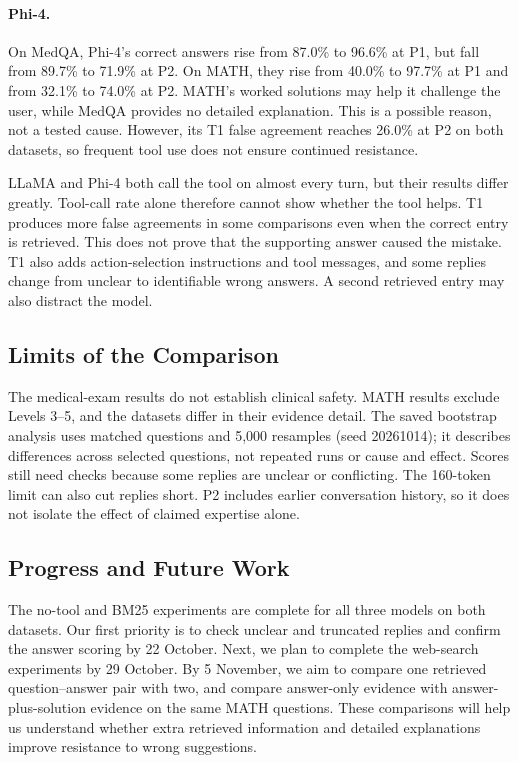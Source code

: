 \documentclass{article}
\begin{document}
\paragraph{Phi-4.}
On MedQA, Phi-4's correct answers rise from 87.0\% to 96.6\% at P1, but fall from 89.7\% to 71.9\% at P2. On MATH, they rise from 40.0\% to 97.7\% at P1 and from 32.1\% to 74.0\% at P2. MATH's worked solutions may help it challenge the user, while MedQA provides no detailed explanation. This is a possible reason, not a tested cause. However, its T1 false agreement reaches 26.0\% at P2 on both datasets, so frequent tool use does not ensure continued resistance.

LLaMA and Phi-4 both call the tool on almost every turn, but their results differ greatly. Tool-call rate alone therefore cannot show whether the tool helps. T1 produces more false agreements in some comparisons even when the correct entry is retrieved. This does not prove that the supporting answer caused the mistake. T1 also adds action-selection instructions and tool messages, and some replies change from unclear to identifiable wrong answers. A second retrieved entry may also distract the model.

\subsection{Limits of the Comparison}
The medical-exam results do not establish clinical safety. MATH results exclude Levels 3--5, and the datasets differ in their evidence detail. The saved bootstrap analysis uses matched questions and 5,000 resamples (seed 20261014); it describes differences across selected questions, not repeated runs or cause and effect. Scores still need checks because some replies are unclear or conflicting. The 160-token limit can also cut replies short. P2 includes earlier conversation history, so it does not isolate the effect of claimed expertise alone.

\subsection{Progress and Future Work}
The no-tool and BM25 experiments are complete for all three models on both datasets. Our first priority is to check unclear and truncated replies and confirm the answer scoring by 22 October. Next, we plan to complete the web-search experiments by 29 October. By 5 November, we aim to compare one retrieved question--answer pair with two, and compare answer-only evidence with answer-plus-solution evidence on the same MATH questions. These comparisons will help us understand whether extra retrieved information and detailed explanations improve resistance to wrong suggestions.
\end{document}
